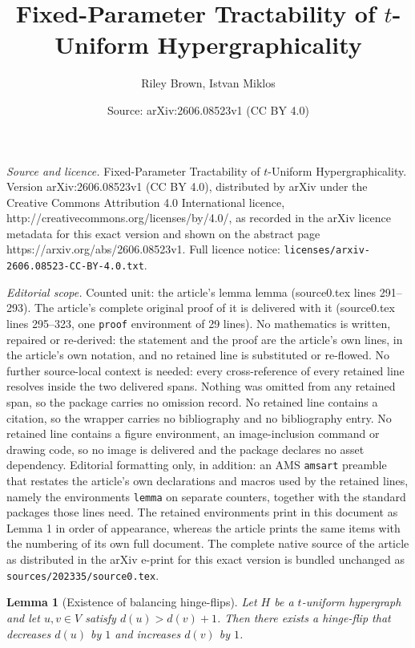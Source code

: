\documentclass[10pt,a4paper]{amsart}
\title{Fixed-Parameter Tractability of $t$-Uniform Hypergraphicality}
\author{Riley Brown, Istvan Miklos}
\date{Source: arXiv:2606.08523v1 (CC BY 4.0)}
\newtheorem{lemma}{Lemma}
\begin{document}
\maketitle

\noindent\emph{Source and licence.} Fixed-Parameter Tractability of $t$-Uniform Hypergraphicality. Version arXiv:2606.08523v1 (CC BY 4.0), distributed by arXiv under the Creative Commons Attribution 4.0 International licence, http://creativecommons.org/licenses/by/4.0/, as recorded in the arXiv licence metadata for this exact version and shown on the abstract page https://arxiv.org/abs/2606.08523v1. Full licence notice: \texttt{licenses/arxiv-2606.08523-CC-BY-4.0.txt}.\par\smallskip

\noindent\textit{Editorial scope.} Counted unit: the article's lemma lemma (source0.tex lines 291--293). The article's complete original proof of it is delivered with it (source0.tex lines 295--323, one \texttt{proof} environment of 29 lines). No mathematics is written, repaired or re-derived: the statement and the proof are the article's own lines, in the article's own notation, and no retained line is substituted or re-flowed.  No further source-local context is needed: every cross-reference of every retained line resolves inside the two delivered spans.  Nothing was omitted from any retained span, so the package carries no omission record.  No retained line contains a citation, so the wrapper carries no bibliography and no bibliography entry.  No retained line contains a figure environment, an image-inclusion command or drawing code, so no image is delivered and the package declares no asset dependency.  Editorial formatting only, in addition: an AMS \texttt{amsart} preamble that restates the article's own declarations and macros used by the retained lines, namely the environments \texttt{lemma} on separate counters, together with the standard packages those lines need.  The retained environments print in this document as Lemma 1 in order of appearance, whereas the article prints the same items with the numbering of its own full document.  The complete native source of the article as distributed in the arXiv e-print for this exact version is bundled unchanged as \texttt{sources/202335/source0.tex}.
\begin{lemma}[Existence of balancing hinge-flips]
Let $H$ be a $t$-uniform hypergraph and let $u,v \in V$ satisfy $d(u) > d(v)+1$. Then there exists a hinge-flip that decreases $d(u)$ by $1$ and increases $d(v)$ by $1$.
\end{lemma}
\end{document}
